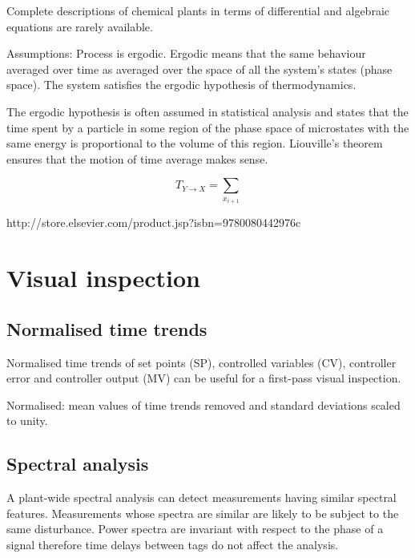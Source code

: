 Complete descriptions of chemical plants in terms of differential and algebraic equations are rarely available.


Assumptions:
Process is ergodic.
Ergodic means that the same behaviour averaged over time as averaged over the space of all the system's states (phase space).
The system satisfies the ergodic hypothesis of thermodynamics.

The ergodic hypothesis is often assumed in statistical analysis and states that the time spent by a particle in some region of the phase space of microstates with the same energy is proportional to the volume of this region.
Liouville's theorem ensures that the motion of time average makes sense.

\begin{equation}
  T_{Y\rightarrow X} = \sum_{x_{i+1}}
\end{equation}



http://store.elsevier.com/product.jsp?isbn=9780080442976c







\section{Visual inspection}

\subsection{Normalised time trends}

Normalised time trends of set points (SP), controlled variables (CV), controller error and controller output (MV) can be useful for a first-pass visual inspection.

Normalised: mean values of time trends removed and standard deviations scaled to unity.

\subsection{Spectral analysis}

A plant-wide spectral analysis can detect measurements having similar spectral features.
Measurements whose spectra are similar are likely to be subject to the same disturbance.
Power spectra are invariant with respect to the phase of a signal therefore time delays between tags do not affect the analysis.



